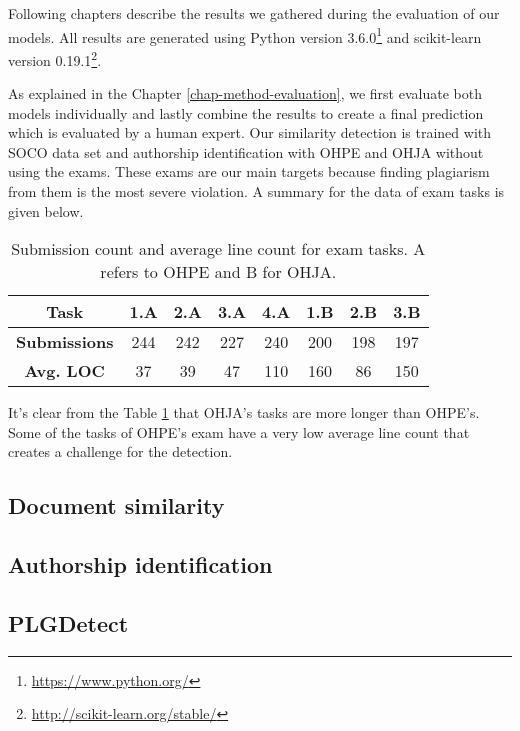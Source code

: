 
Following chapters describe the results we gathered during the evaluation of our models. All results are generated using Python version 3.6.0\footnote{\url{https://www.python.org/}} and scikit-learn version 0.19.1\footnote{\url{http://scikit-learn.org/stable/}}. 

As explained in the Chapter \ref{chap-method-evaluation}, we first evaluate both models individually and lastly combine the results to create a final prediction which is evaluated by a human expert. Our similarity detection is trained with SOCO data set and authorship identification with OHPE and OHJA without using the exams. These exams are our main targets because finding plagiarism from them is the most severe violation. A summary for the data of exam tasks is given below.

\begin{table}[ht]
\centering
\caption{Submission count and average line count for exam tasks. A refers to OHPE and B for OHJA.}
\label{tbl-exam-data}
\begin{tabular}{|c||c|c|c|c|c|c|c|}
\hline
\bf Task        & 1.A & 2.A & 3.A & 4.A & 1.B & 2.B & 3.B \\ \hline
\bf Submissions & 244 & 242 & 227 & 240 & 200 & 198 & 197 \\ \hline
\bf Avg. LOC    & 37  & 39  & 47  & 110 & 160 & 86  & 150 \\ \hline
\end{tabular}
\end{table}

\noindent
It's clear from the Table \ref{tbl-exam-data} that OHJA's tasks are more longer than OHPE's. Some of the tasks of OHPE's exam have a very low average line count that creates a challenge for the detection.

\subsection{Document similarity} \label{chap-sd-result}



\subsection{Authorship identification}


\subsection{PLGDetect}



\newpage
